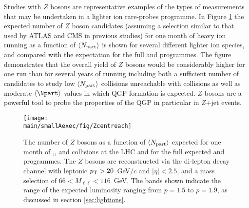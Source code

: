 Studies with $Z$ bosons are representative examples of the types of measurements that may be undertaken in a lighter ion rare-probes programme.  In Figure \ref{fig:Zreach} the expected number of $Z$ boson candidates (assuming a selection similar to that used by ATLAS and CMS in previous studies) for one month of heavy ion running  as a function of $\langle N_{\rm part}\rangle$ is shown for several different lighter ion species, and compared with the expectation for the full \PbPb and \pPb programmes.  The figure demonstrates that the overall yield of $Z$ bosons would be considerably higher for one \ArAr run than for several years of \PbPb running including both a sufficient number of candidates to study low $\langle N_{\rm part}\rangle$ collisions unreachable with \PbPb collisions as well as moderate $\langle\Npart\rangle$ values in which QGP formation is expected.  $Z$ bosons are a powerful tool to probe the properties of the QGP in particular in $Z$+jet events.  
\begin{figure}
\centering
\texttt{[image: \\main/smallAexec/fig/Zcentreach]}
\caption{
The number of $Z$ bosons as a function of $\langle N_{\rm part}\rangle$ expected for one month of \OO,\ArAr, and \KrKr collisions at the LHC and for the full expected \PbPb and \pPb programmes.  The $Z$ bosons are reconstructed via the di-lepton decay channel with leptonic $p\sb{\scriptstyle\mathrm{T}}>20$~GeV$/c$ and $|\eta|<2.5$, and a mass selection of $66<M_{\ell\ell}<116$~GeV.  %
The bands shown indicate the range of the expected luminosity ranging from $p=1.5$ to $p=1.9$, as discussed in section \ref{sec:lightions}.
\label{fig:Zreach}}
\end{figure}

